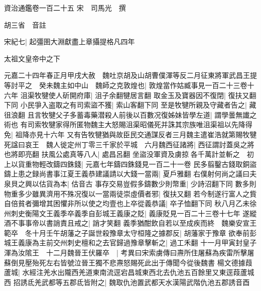 資治通鑑卷一百二十五
宋　司馬光　撰

胡三省　音註

宋紀七|{
	起彊圉大淵獻盡上章攝提格凡四年}


太祖文皇帝中之下

元嘉二十四年春正月甲戌大赦　魏吐京胡及山胡曹僕渾等反二月征東將軍武昌王提等討平之　癸未魏主如中山　魏師之克敦煌也|{
	敦煌當作姑臧事見一百二十三卷十六年}
沮渠牧犍使人斫開府庫|{
	沮子余翻犍居言翻}
取金玉及寶器因不復閉|{
	復扶又翻下同}
小民爭入盗取之有司索盜不獲|{
	索山客翻下同}
至是牧犍所親及守藏者告之|{
	藏徂浪翻}
且言牧犍父子多蓄毒藥潜殺人前後以百數况復姊妹皆學左道|{
	謂學曇無䜟之術也}
有司索牧犍家得所匿物魏主大怒賜沮渠昭儀死并誅其宗族唯沮渠祖以先降得免|{
	祖降亦見十六年}
又有告牧犍猶與故臣民交通謀反者三月魏主遣崔浩就第賜牧犍死諡曰哀王　魏人徙定州丁零三千家於平城　六月魏西征諸將|{
	西征謂討蓋吳之將也將即亮翻}
扶風公處真等八人|{
	處昌呂翻}
坐盜没軍資及虜掠各千萬計並斬之　初上以貨重物輕改鑄四銖錢|{
	元嘉七年鑄四銖錢見一百二十一卷}
民多翦鑿古錢取銅盜鑄上患之録尚書事江夏王義恭建議請以大錢一當兩|{
	夏戶雅翻}
右僕射何尚之議曰夫泉貝之興以估貨為本|{
	估音古}
事存交易豈假多鑄數少則幣重|{
	少詩沼翻下同}
數多則物重多少雖異濟用不殊况復以一當兩徒崇虛價者邪|{
	復扶又翻}
若今制遂行富人之貲自倍貧者彌增其困懼非所以使之均壹也上卒從義恭議|{
	卒子恤翻下同}
秋八月乙未徐州刺史衡陽文王義季卒義季自彭城王義康之貶|{
	義康貶見一百二十三卷十七年}
遂縱酒不事事帝以書誚責且戒之|{
	誚才笑翻}
義季猶酣飲自若以至成疾而終　魏樂安宣王範卒　冬十月壬午胡藩之子誕世殺豫章太守桓隆之據郡反|{
	胡藩家于豫章}
欲奉前彭城王義康為主前交州刺史檀和之去官歸過豫章擊斬之|{
	過工禾翻}
十一月甲寅封皇子渾為汝隂王　十二月魏晉王伏羅卒　|{
	考異曰宋索虜傳曰燾所住屠蘇為疾雷所擊屠蘇倒見壓殆死左右皆號泣晉王獨不悲燾怒賜死此出于傳聞今從後魏書}
楊文德據葭蘆城|{
	水經注羌水出隴西羌道東南流逕宕昌城東西北去仇池五百餘里又東逕葭蘆城西}
招誘氐羌武都等五郡氐皆附之|{
	魏取仇池置武都天水漢陽武階仇池五郡誘音酉}


